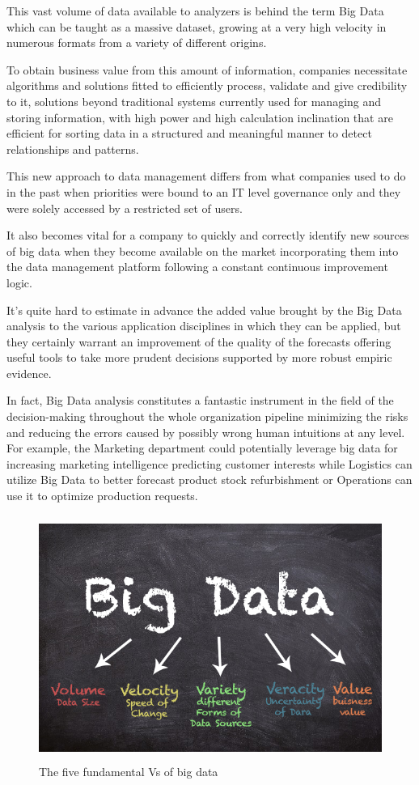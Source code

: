 This vast volume of data available to analyzers is behind the term Big Data which can be taught as a massive dataset, growing at a very high velocity in numerous formats from a variety of different origins.

To obtain business value from this amount of information, companies necessitate algorithms and solutions fitted to efficiently process, validate and give credibility to it, solutions beyond traditional systems currently used for managing and storing information, with high power and high calculation inclination that are efficient for sorting data in a structured and meaningful manner to detect relationships and patterns.

This new approach to data management differs from what companies used to do in the past when priorities were bound to an IT level governance only and they were solely accessed by a restricted set of users. 

It also becomes vital for a company to quickly and correctly identify new sources of big data when they become available on the market incorporating them into the data management platform following a constant continuous improvement logic.

It's quite hard to estimate in advance the added value brought by the Big Data analysis to the various application disciplines in which they can be applied, but they certainly warrant an improvement of the quality of the forecasts offering useful tools to take more prudent decisions supported by more robust empiric evidence.

In fact, Big Data analysis constitutes a fantastic instrument in the field of the decision-making throughout the whole organization pipeline minimizing the risks and reducing the errors caused by possibly wrong human intuitions at any level. For example, the Marketing department could potentially leverage big data for increasing marketing intelligence predicting customer interests while Logistics can utilize Big Data to better forecast product stock refurbishment or Operations can use it to optimize production requests.

\vspace{0.5cm}
\begin{figure}[htbp]
  \centering
    \includegraphics[height=8cm]{images/bigdata.png}
  \caption{The five fundamental Vs of big data }
  \label{fig:bigdata}
\end{figure}
\vspace{0.5cm}

